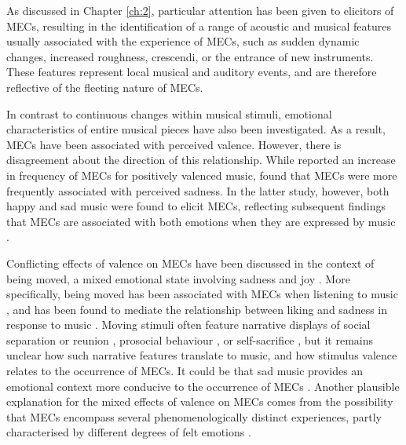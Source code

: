 As discussed in Chapter \ref{ch:2}, particular attention has been given to elicitors of MECs, resulting in the identification of a range of acoustic and musical features usually associated with the experience of MECs, such as sudden dynamic changes, increased roughness, crescendi, or the entrance of new instruments. These features represent local musical and auditory events, and are therefore reflective of the fleeting nature of MECs.

In contrast to continuous changes within musical stimuli, emotional characteristics of entire musical pieces have also been investigated. As a result, MECs have been associated with perceived valence. However, there is disagreement about the direction of this relationship. While \textcite{grewe2011} reported an increase in frequency of MECs for positively valenced music, \textcite{panksepp1995} found that MECs were more frequently associated with perceived sadness. In the latter study, however, both happy and sad music were found to elicit MECs, reflecting subsequent findings that MECs are associated with both emotions when they are expressed by music \parencite{bannister2020a, mori2017, panksepp1995}.

Conflicting effects of valence on MECs have been discussed in the context of being moved, a mixed emotional state involving sadness and joy \parencite{menninghaus2015}. More specifically, being moved has been associated with MECs when listening to music \parencite{bannister2019, bannister2020a, bannister2018, benedek2011}, and has been found to mediate the relationship between liking and sadness in response to music \parencite{vuoskoski2017}. Moving stimuli often feature narrative displays of social separation or reunion \parencite{wassiliwizky2015}, prosocial behaviour \parencite{wassiliwizky2017a}, or self-sacrifice \parencite{konecni2007b}, but it remains unclear how such narrative features translate to music, and how stimulus valence relates to the occurrence of MECs. It could be that sad music provides an emotional context more conducive to the occurrence of MECs \parencite{panksepp1995}. Another plausible explanation for the mixed effects of valence on MECs comes from the possibility that MECs encompass several phenomenologically distinct experiences, partly characterised by different degrees of felt emotions \parencite{bannister2019, maruskin2012}.

